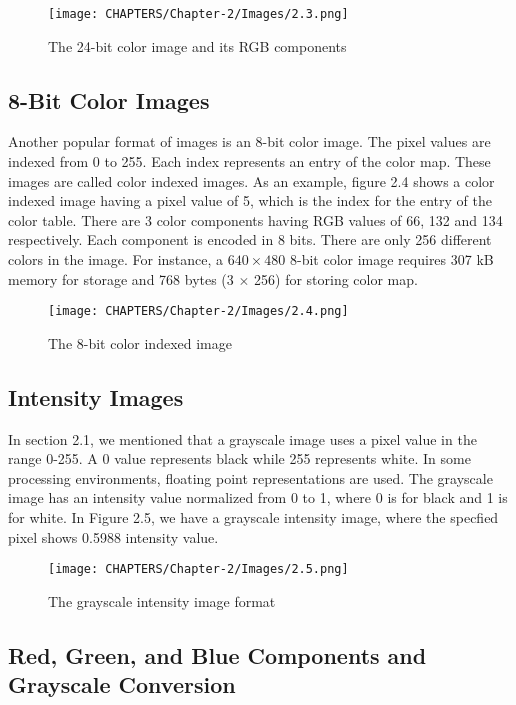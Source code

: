 \begin{figure}[H]
	\centering
	\texttt{[image: CHAPTERS/Chapter-2/Images/2.3.png]}
	\caption{The 24-bit color image and its RGB components}
	\label{fig:2.3}
\end{figure}

\subsection{8-Bit Color Images}
Another popular format of images is an 8-bit color image. The pixel 
values are indexed from 0 to 255. Each index represents an entry of the 
color map. These images are called color indexed images. As an example, figure 2.4 shows 
a color indexed image having a pixel value of 5, which is the index for the entry of 
the color table. There are 3 color components having 
RGB values of 66, 132 and 134 respectively. 
Each component is encoded in 8 bits. There are 
only 256 different colors in the image. For instance, a
$640\times 480$ 8-bit color image requires 307 kB memory
for storage and 768 bytes (3 $\times$ 256) for storing
color map.

\begin{figure}[H]
	\centering
	\texttt{[image: CHAPTERS/Chapter-2/Images/2.4.png]}
	\caption{The 8-bit color indexed image}
	\label{fig:2.4}
\end{figure}

\subsection{Intensity Images}
In section 2.1, we mentioned that a grayscale image uses a 
pixel value in the range 0-255. A 0 value represents black while 255 
represents white. In some processing environments, floating point representations 
are used. The grayscale image has an intensity value normalized from 0 to 1, where 0 is 
for black and 1 is for white. In Figure 2.5, we have a grayscale intensity 
image, where the specfied pixel shows 0.5988 intensity value.

\begin{figure}[H]
	\centering
	\texttt{[image: CHAPTERS/Chapter-2/Images/2.5.png]}
	\caption{The grayscale intensity image format}
	\label{fig:2.5}
\end{figure}

\subsection{Red, Green, and Blue Components and Grayscale Conversion}

